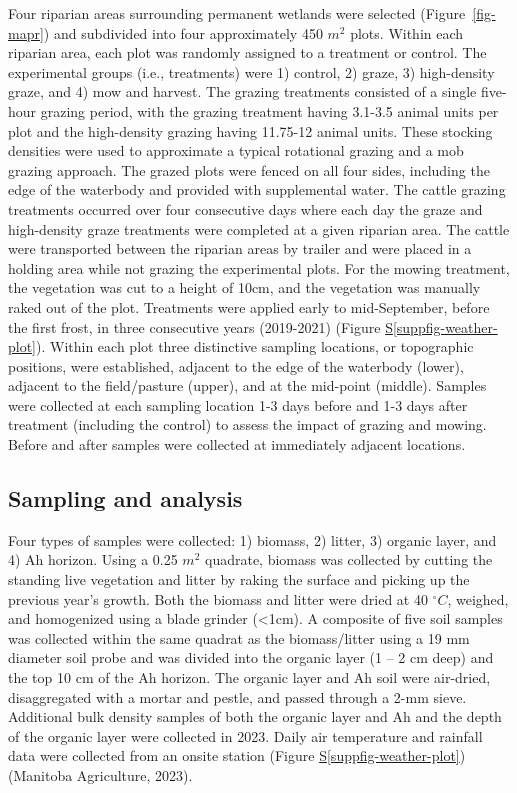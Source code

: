 \documentclass[
]{agujournal2019}
\newcommand*\quartosuppfigref[1]{Figure \hyperref[#1]{S\ref{#1}}}
\begin{document}
Four riparian areas surrounding permanent wetlands were selected
(Figure~\ref{fig-mapr}) and subdivided into four approximately 450
\(m^2\) plots. Within each riparian area, each plot was randomly
assigned to a treatment or control. The experimental groups (i.e.,
treatments) were 1) control, 2) graze, 3) high-density graze, and 4) mow
and harvest. The grazing treatments consisted of a single five-hour
grazing period, with the grazing treatment having 3.1-3.5 animal units
per plot and the high-density grazing having 11.75-12 animal units.
These stocking densities were used to approximate a typical rotational
grazing and a mob grazing approach. The grazed plots were fenced on all
four sides, including the edge of the waterbody and provided with
supplemental water. The cattle grazing treatments occurred over four
consecutive days where each day the graze and high-density graze
treatments were completed at a given riparian area. The cattle were
transported between the riparian areas by trailer and were placed in a
holding area while not grazing the experimental plots. For the mowing
treatment, the vegetation was cut to a height of 10cm, and the
vegetation was manually raked out of the plot. Treatments were applied
early to mid-September, before the first frost, in three consecutive
years (2019-2021) (\quartosuppfigref{suppfig-weather-plot}). Within each
plot three distinctive sampling locations, or topographic positions,
were established, adjacent to the edge of the waterbody (lower),
adjacent to the field/pasture (upper), and at the mid-point (middle).
Samples were collected at each sampling location 1-3 days before and 1-3
days after treatment (including the control) to assess the impact of
grazing and mowing. Before and after samples were collected at
immediately adjacent locations.

\subsection{Sampling and analysis}\label{sampling-and-analysis}

Four types of samples were collected: 1) biomass, 2) litter, 3) organic
layer, and 4) Ah horizon. Using a 0.25 \(m^2\) quadrate, biomass was
collected by cutting the standing live vegetation and litter by raking
the surface and picking up the previous year's growth. Both the biomass
and litter were dried at 40 \(^\circ C\), weighed, and homogenized using
a blade grinder (\textless1cm). A composite of five soil samples was
collected within the same quadrat as the biomass/litter using a 19 mm
diameter soil probe and was divided into the organic layer (1 -- 2 cm
deep) and the top 10 cm of the Ah horizon. The organic layer and Ah soil
were air-dried, disaggregated with a mortar and pestle, and passed
through a 2-mm sieve. Additional bulk density samples of both the
organic layer and Ah and the depth of the organic layer were collected
in 2023. Daily air temperature and rainfall data were collected from an
onsite station (\quartosuppfigref{suppfig-weather-plot}) (Manitoba
Agriculture, 2023).
\end{document}

